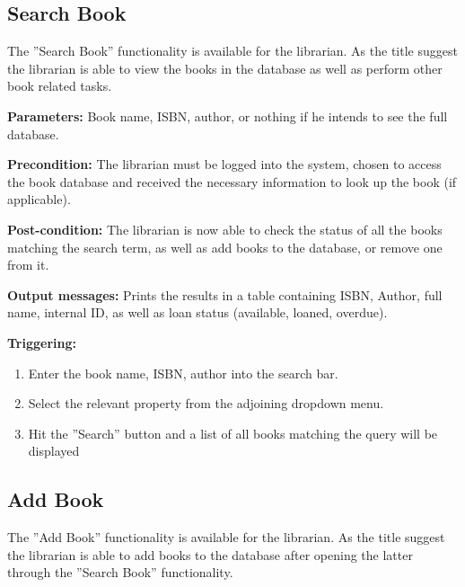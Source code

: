 \subsection{Search Book}

The ''Search Book'' functionality is available for the librarian. As the title
suggest the librarian is able to view the books in the database as well as
perform other book related tasks.

\begin{description}

\item \textbf{Parameters:} Book name, ISBN, author, or nothing if he intends to
see the full database.

\item \textbf{Precondition:} The librarian must be logged into the system,
chosen to access the book database and received the necessary information to
look up the book (if applicable).

\item \textbf{Post-condition:} The librarian is now able to check the status of
all the books matching the search term, as well as add books to the database,
or remove one from it.

\item \textbf{Output messages:} Prints the results in a table containing ISBN,
Author, full name, internal ID, as well as loan status (available, loaned,
overdue).

\item \textbf{Triggering:}
\begin{enumerate}
\item Enter the book name, ISBN, author into the search bar.
\item Select the relevant property from the adjoining dropdown menu.
\item Hit the ''Search'' button and a list of all books matching the query
will be displayed
\end{enumerate}

\end{description}

\subsection{Add Book}

The ''Add Book'' functionality is available for the librarian. As the title
suggest the librarian is able to add books to the database after opening the
latter through the ''Search Book'' functionality.

